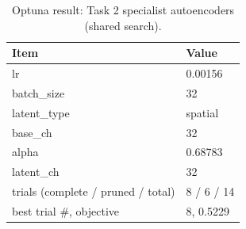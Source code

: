 \begin{table}[t]
\centering
\caption{Optuna result: Task 2 specialist autoencoders (shared search).}
\label{tab:optuna_ae_specialist_best}
\footnotesize
\begin{tabular}{ll}
\toprule
Item & Value \\
\midrule
lr & 0.00156 \\
batch\_size & 32 \\
latent\_type & spatial \\
base\_ch & 32 \\
alpha & 0.68783 \\
latent\_ch & 32 \\
trials (complete / pruned / total) & 8 / 6 / 14 \\
best trial \#, objective & 8, 0.5229 \\
\bottomrule
\end{tabular}
\end{table}
